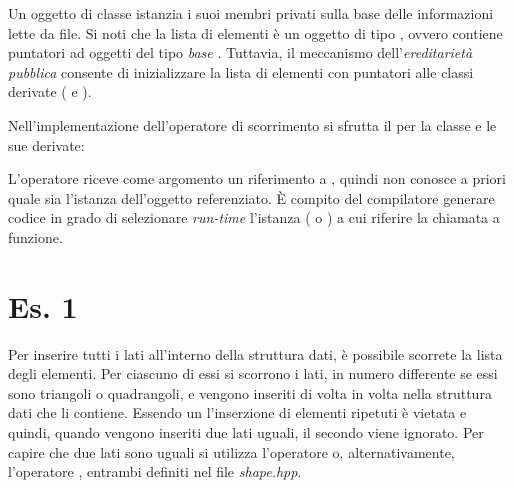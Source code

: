 \lstset{basicstyle=\scriptsize\sf}





\lstset{basicstyle=\sf}

Un oggetto di classe  istanzia i suoi membri privati sulla base delle
informazioni lette da file. Si noti che la lista di elementi \`e un
oggetto di tipo , ovvero contiene puntatori
ad oggetti del tipo \emph{base} . Tuttavia, il
meccanismo dell'\emph{ereditariet\`a pubblica} consente di
inizializzare la lista di elementi con puntatori alle classi derivate
( e ).

Nell'implementazione dell'operatore di scorrimento si sfrutta il
 per la classe  e le sue derivate:

\lstset{basicstyle=\scriptsize\sf}

\lstset{basicstyle=\sf}

L'operatore riceve come argomento un riferimento a , quindi
non conosce a priori quale sia l'istanza dell'oggetto referenziato. \`E compito del compilatore
generare codice in grado di selezionare \emph{run-time} l'istanza
( o ) a cui riferire la chiamata a
funzione.

\lstset{basicstyle=\scriptsize\sf}


\lstset{basicstyle=\sf}

\section*{Es. 1}

Per inserire tutti i lati all'interno della struttura dati, \`e possibile 
scorrete la lista degli elementi. Per ciascuno di essi si scorrono i lati,
in numero differente se essi sono triangoli o quadrangoli, e vengono inseriti
di volta in volta nella struttura dati che li contiene. Essendo un 
l'inserzione di elementi ripetuti \`e vietata e quindi, quando vengono inseriti
due lati uguali, il secondo viene ignorato. Per capire che due lati sono uguali
si utilizza l'operatore \cpp{<} o, alternativamente, l'operatore \cpp{==},
entrambi definiti nel file \textit{shape.hpp}. 

